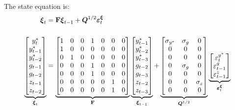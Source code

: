 \documentclass[a4paper,12pt]{article}
\begin{document}
\esq The state equation is:%
\begin{align}
\boldsymbol{\xi }_{t}& =\mathbf{F}\boldsymbol{\xi }_{t-1}+\boldsymbol{Q}%
^{1/2}\boldsymbol{\varepsilon }_{t}^{\boldsymbol{\xi }}  \notag \\[5mm]
\underbrace{%
\begin{bmatrix}
y_{t}^{\ast } \\
y_{t-1}^{\ast } \\
y_{t-2}^{\ast } \\
g_{t-1} \\
g_{t-2} \\
z_{t-1} \\
z_{t-2}%
\end{bmatrix}%
}_{\boldsymbol{\xi }_{t}}& =\underbrace{%
\begin{bmatrix}
1 & 0 & 0 & 1 & 0 & 0 & 0 \\
1 & 0 & 0 & 0 & 0 & 0 & 0 \\
0 & 1 & 0 & 0 & 0 & 0 & 0 \\
0 & 0 & 0 & 1 & 0 & 0 & 0 \\
0 & 0 & 0 & 1 & 0 & 0 & 0 \\
0 & 0 & 0 & 0 & 0 & 1 & 0 \\
0 & 0 & 0 & 0 & 0 & 1 & 0%
\end{bmatrix}%
}_{\mathbf{F}}\underbrace{%
\begin{bmatrix}
y_{t-1}^{\ast } \\
y_{t-2}^{\ast } \\
y_{t-3}^{\ast } \\
g_{t-2} \\
g_{t-3} \\
z_{t-2} \\
z_{t-3}%
\end{bmatrix}%
}_{\boldsymbol{\xi }_{t-1}}+\underbrace{%
\begin{bmatrix}
\sigma _{y^{\ast }} & \sigma _{g} & 0 \\
0 & 0 & 0 \\
0 & 0 & 0 \\
0 & \sigma _{g} & 0 \\
0 & 0 & 0 \\
0 & 0 & \sigma _{z} \\
0 & 0 & 0%
\end{bmatrix}%
}_{\boldsymbol{Q}^{1/2}}\underbrace{%
\begin{bmatrix}
\varepsilon _{t}^{y^{\ast }} \\
\varepsilon _{t-1}^{g} \\
\varepsilon _{t-1}^{z}%
\end{bmatrix}%
}_{\boldsymbol{\varepsilon }_{t}^{\boldsymbol{\xi }}}  \label{state1}
\end{align}
\end{document}
